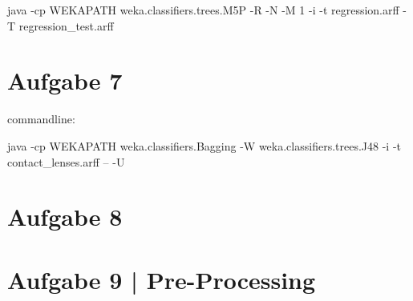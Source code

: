 java -cp WEKAPATH weka.classifiers.trees.M5P -R -N -M 1 -i -t regression.arff -T regression\_test.arff

\section{Aufgabe 7}
commandline: 

java -cp WEKAPATH weka.classifiers.Bagging -W weka.classifiers.trees.J48 -i -t contact\_lenses.arff -- -U

\newpage


\section{Aufgabe 8}

\newpage


\section{Aufgabe 9 | Pre-Processing}


\newpage

